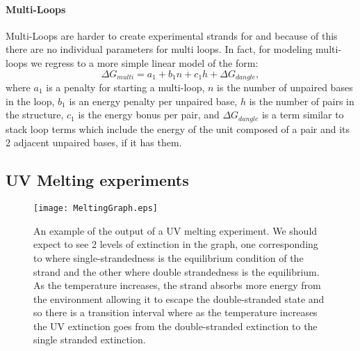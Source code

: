 \paragraph{Multi-Loops}
Multi-Loops are harder to create experimental strands for and because
of this there are no individual parameters for multi loops. In fact,
for modeling multi-loops we regress to a more simple linear model of
the form:
\begin{equation}
\Delta G_{multi} = a_1 + b_1 n + c_1 h + \Delta G_{dangle},
\end{equation}
where $a_1$ is a penalty for starting a multi-loop, $n$ is the number
of unpaired bases in the loop, $b_1$ is an energy penalty per unpaired
base, $h$ is the number of pairs in the structure, $c_1$ is the energy
bonus per pair, and $\Delta G_{dangle}$ is a term similar to stack
loop terms which include the energy of the unit composed of a pair and
its 2 adjacent unpaired bases, if it has them.


\subsection{UV Melting experiments}

\begin{figure}[h]
\centering
\texttt{[image: MeltingGraph.eps]}

\caption[UV Melting Output]{An example of the output of a UV melting experiment. We
  should expect to see 2 levels of extinction in the graph, one
  corresponding to where single-strandedness is the equilibrium
  condition of the strand and the other where double strandedness is
  the equilibrium. As the temperature increases, the strand absorbs
  more energy from the environment allowing it to escape the
  double-stranded state and so there is a transition interval where as
  the temperature increases the UV extinction goes from the
  double-stranded extinction to the single stranded extinction.}
\label{fig:UVMeltGraph}
\end{figure}

